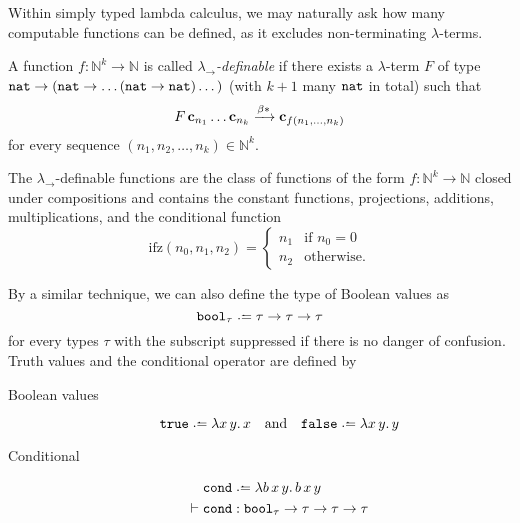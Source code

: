 Within simply typed lambda calculus, we may naturally ask how many computable
functions can be defined, as it excludes non-terminating $\lambda$-terms. 
\begin{definition}
  A function $f\colon \mathbb{N}^k \to \mathbb{N}$ is called
  \emph{$\lambda_\to$-definable} if there exists a $\lambda$-term $F$
   of type $\mathtt{nat} \to (\mathtt{nat} \to \dots (\mathtt{nat} \to \mathtt{nat})\dots)$ (with $k+1$
  many $\mathtt{nat}$ in total) such that
  \[
    F\,\mathbf{c}_{n_1}\ldots\mathbf{c}_{n_k} \xrightarrow{\beta*} \mathbf{c}_{f(n_1, \dots, n_k)}
  \]
  for every sequence $(n_1, n_2, \ldots, n_k) \in \mathbb{N}^k$.
\end{definition}
\begin{theorem}[Schwichtenberg]
  The $\lambda_\to$-definable functions are the class of functions
  of the form $f\colon \mathbb{N}^k \to \mathbb{N}$ closed under compositions
  and contains the constant functions, projections, additions, multiplications,
  and the conditional function 
  \[
    \mathrm{ifz}(n_0, n_1, n_2) = 
    \begin{cases}
      n_1 & \text{if } n_0 = 0\\
      n_2 & \text{otherwise.}
    \end{cases}
  \]
\end{theorem}

By a similar technique, we can also define the type of Boolean values as
\[
  \bool_\tau \defeq \tau \to \tau \to \tau
\]
for every types $\tau$ with the subscript suppressed if there is no danger of
confusion.  Truth values and the conditional operator are defined by
\begin{description}
  \item[Boolean values]
      \[
        \true \defeq \lambda x\,y.\,x \\
        \quad\text{and}\quad
        \false \defeq \lambda x\,y.\,y \\
      \]
  \item[Conditional]
    \begin{align*}
      & \cond \defeq \lambda b\,x\,y.\, b\,x\,y\\
      \vdash {} & \cond : \bool_{\tau} \to \tau \to \tau \to \tau
    \end{align*}
\end{description}

